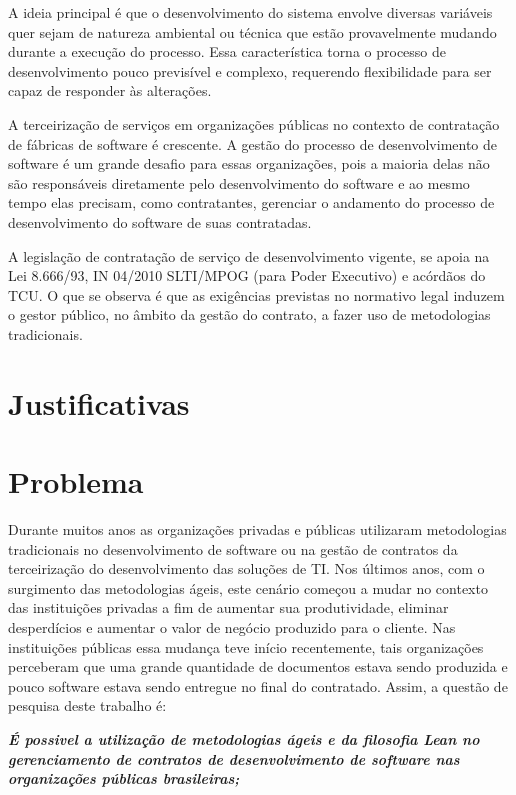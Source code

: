 A ideia principal é que o desenvolvimento do sistema envolve diversas variáveis quer sejam de natureza ambiental ou técnica que estão provavelmente mudando durante a execução do processo. Essa característica torna o processo de desenvolvimento pouco previsível e complexo, requerendo flexibilidade para ser capaz de responder às alterações.

A terceirização de serviços em organizações públicas no contexto de contratação de fábricas de software é crescente. A gestão do processo de desenvolvimento de software é um grande desafio para essas organizações, pois a maioria delas não são responsáveis diretamente pelo desenvolvimento do software e ao mesmo tempo elas precisam, como contratantes, gerenciar o andamento do processo de desenvolvimento do software de suas contratadas. 

A legislação de contratação de serviço de desenvolvimento vigente, se apoia na Lei 8.666/93, IN 04/2010 SLTI/MPOG (para Poder Executivo) e acórdãos do TCU. O que se observa é que as exigências previstas no normativo legal induzem o gestor público, no âmbito da gestão do contrato, a fazer uso de metodologias tradicionais.



\section[Justificativas]{Justificativas}

\section[Problema]{Problema}

Durante muitos anos as organizações privadas e públicas utilizaram metodologias tradicionais no desenvolvimento de software ou na gestão de contratos da terceirização do desenvolvimento das soluções de TI. Nos últimos anos, com o surgimento das metodologias ágeis, este cenário começou a mudar no contexto das instituições privadas a fim de aumentar sua produtividade, eliminar desperdícios e aumentar o valor de negócio produzido para o cliente. Nas instituições públicas essa mudança teve início recentemente, tais organizações perceberam que uma grande quantidade de documentos estava sendo produzida e pouco software estava sendo entregue no final do contratado. Assim, a questão de pesquisa deste trabalho é:

\textit{\textbf {É possivel a utilização de metodologias ágeis e da filosofia Lean no gerenciamento de contratos de desenvolvimento de software nas organizações públicas brasileiras;}}

